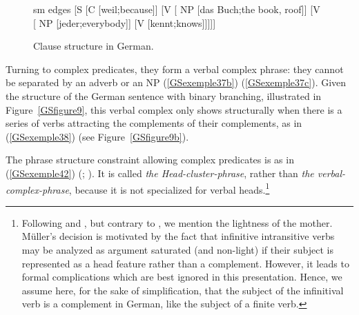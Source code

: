 \documentclass[output=paper
	        ,collection
	        ,collectionchapter
 	        ,biblatex
                ,babelshorthands
                ,newtxmath
                ,draftmode
                ,colorlinks, citecolor=brown
]{langscibook}
\begin{document}
{

\z


\begin{figure}
    \centering
	\begin{forest}
	sm edges
 	[S 
    [C [weil;because]]
    [V  
        [ NP [das Buch;the book, roof]]    
        [V  
            [ NP [jeder;everybody]]
            [V  [kennt;knows]]]]]
\end{forest}
    \caption{Clause structure in German.}
    \label{GSfigure10}
\end{figure}



Turning to complex predicates, they form a verbal complex phrase: they cannot be separated by an adverb or an NP (\ref{GSexemple37b}) (\ref{GSexemple37c}). Given the structure of the German sentence with binary branching, illustrated in Figure~\ref{GSfigure9}, this verbal complex only shows structurally when there is a series of verbs attracting the complements of their complements, as in (\ref{GSexemple38}) (see Figure~\ref{GSfigure9b}).

The phrase structure constraint allowing complex predicates is as in (\ref{GSexemple42}) (\citealt{MuellerCopula}; \citealt[39]{muller2018clause}). It is called \emph{the Head-cluster-phrase}, rather than \emph{the verbal-complex-phrase}, because it is not specialized for verbal heads.\footnote{Following \cite{HN94a} and \cite{dKM2001a}, but contrary to \cite{muller2018clause}, we mention the lightness of the mother. Müller’s decision is motivated by the fact that infinitive intransitive verbs may be analyzed as argument saturated (and non-light) if their subject is represented as a head feature rather than a complement. However, it leads to formal complications which are best ignored in this presentation. Hence, we assume here, for the sake of simplification, that the subject of the infinitival verb is a complement in German, like the subject of a finite verb.  }  

}
\end{document}
